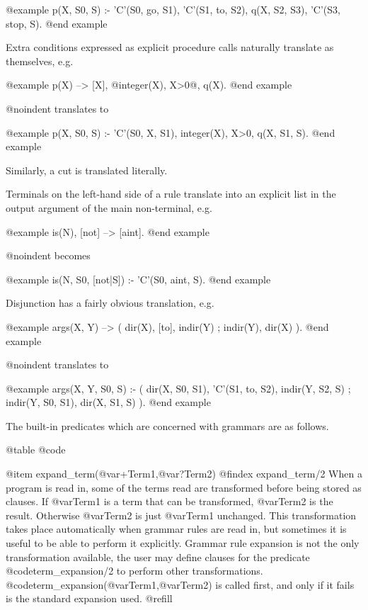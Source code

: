 @example
p(X, S0, S) :-
        'C'(S0, go, S1), 
        'C'(S1, to, S2), 
        q(X, S2, S3), 
        'C'(S3, stop, S).
@end example

Extra conditions expressed as explicit procedure calls naturally translate
as themselves, e.g.

@example
p(X) --> [X], @{integer(X), X>0@}, q(X).
@end example

@noindent
translates to

@example
p(X, S0, S) :- 
        'C'(S0, X, S1), 
        integer(X), 
        X>0, 
        q(X, S1, S).
@end example

Similarly, a cut is translated literally.

Terminals on the left-hand side of a rule translate into an explicit list
in the output argument of the main non-terminal, e.g.

@example
is(N), [not] --> [aint].
@end example

@noindent
becomes

@example
is(N, S0, [not|S]) :- 'C'(S0, aint, S).
@end example

Disjunction has a fairly obvious translation, e.g.

@example
args(X, Y) --> 
        (   dir(X), [to], indir(Y)
        ;   indir(Y), dir(X)
        ).
@end example

@noindent
translates to

@example
args(X, Y, S0, S) :-
        (   dir(X, S0, S1), 
            'C'(S1, to, S2), 
            indir(Y, S2, S)
        ;   indir(Y, S0, S1), 
            dir(X, S1, S)
        ).
@end example

The built-in predicates which are concerned with grammars are as follows.

@table @code

@item expand_term(@var{+Term1},@var{?Term2})
@findex expand_term/2
When a program is read in, some of the terms read are transformed before
being stored as clauses.  If @var{Term1} is a term that can be
transformed, @var{Term2} is the result.  Otherwise @var{Term2} is just
@var{Term1} unchanged.  This transformation takes place automatically
when grammar rules are read in, but sometimes it is useful to be able to
perform it explicitly.  Grammar rule expansion is not the only
transformation available, the user may define clauses for the predicate
@code{term_expansion/2} to perform other transformations.
@code{term_expansion(@var{Term1},@var{Term2})} is called first, and only
if it fails is the standard expansion used. @refill

